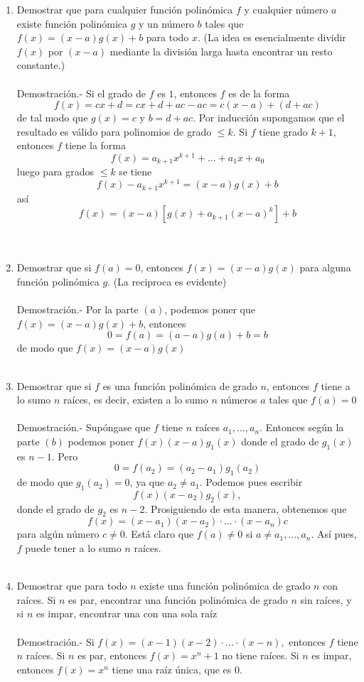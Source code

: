\begin{enumerate}[\bfseries 1.]
\begin{enumerate}[\bfseries (a)]
	    \item Demostrar que para cualquier función polinómica $f$ y cualquier número $a$ existe función polinómica $g$ y un número $b$ tales que $f(x)=(x-a)g(x)+b$ para todo $x$. (La idea es esencialmente dividir $f(x)$ por $(x-a)$ mediante la división larga hasta encontrar un resto constante.)\\\\
	    Demostración.- \; Si el grado de $f$ es $1$, entonces $f$ es de la forma $$f(x)=cx+d=cx+d +ac-ac=c(x-a)+(d+ac)$$ de tal modo que $g(x)=c$ y $b=d+ac$. Por inducción supongamos que el resultado es válido para polinomios de grado $\leq k.$ Si $f$ tiene grado $k+1$, entonces $f$ tiene la forma $$f(x)=a_{k+1}x^{k+1} + ... + a_1x + a_0$$ luego para grados $\leq k$ se tiene $$f(x)-a_{k+1}x^{k+1} =(x-a)g(x)+b$$ así $$f(x) = (x-a)\left[g(x) + a_{k+1}(x-a)^k\right]+b$$\\\\

	    \item Demostrar que si $f(a)=0$, entonces $f(x)=(x-a)g(x)$ para alguna función polinómica $g$. (La reciproca es evidente)\\\\
	    Demostración.- \; Por la parte $(a)$, podemos poner que $f(x)=(x-a)g(x)+b$, entonces $$0=f(a)=(a-a)g(a)+b=b$$ de modo que $f(x)=(x-a)g(x)$\\\\

	    \item Demostrar que si $f$ es una función polinómica de grado $n$, entonces $f$ tiene a lo sumo $n$ raíces, es decir, existen a lo sumo $n$ números $a$ tales que $f(a)=0$\\\\
	    Demostración.- \; Supóngase que $f$ tiene $n$ raíces $a_1,...,a_n$. Entonces según la parte $(b)$ podemos poner $f(x)(x-a)g_1(x)$ donde el grado de $g_1(x)$ es $n-1$. Pero $$0=f(a_2)=(a_2-a_1)g_1(a_2)$$ de modo que $g_1(a_2)=0$, ya que $a_2 \neq a_1$. Podemos pues escribir $$f(x)(x-a_2)g_2(x),$$ donde el grado de $g_2$ es $n-2$. Prosiguiendo de esta manera, obtenemos que $$f(x)=(x-a_1)(x-a_2)\cdot ... \cdot (x-a_n)c$$ para algún número $c \neq 0.$ Está claro que $f(a)\neq 0$ si $a \neq a_1,...,a_n.$ Así pues, $f$ puede tener a lo sumo $n$ raíces.\\\\

	    \item Demostrar que para todo $n$ existe una función polinómica de grado $n$ con raíces. Si $n$ es par, encontrar una función polinómica de grado $n$ sin raíces, y si $n$ es impar, encontrar una con una sola raíz\\\\
	    Demostración.- \; Si $f(x)=(x-1)(x-2)\cdot ... \cdot (x-n),$ entonces $f$ tiene $n$ raíces. Si $n$ es par, entonces $f(x)=x^n + 1$ no tiene raíces. Si $n$ es impar, entonces $f(x)=x^n$ tiene una raíz única, que es $0.$\\\\


\end{enumerate}
\end{enumerate}
